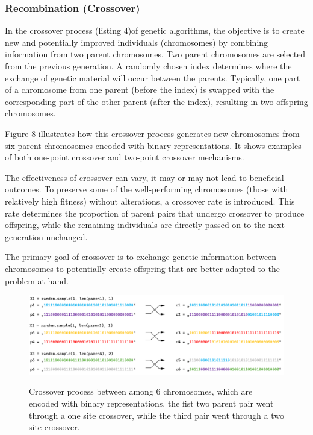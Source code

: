 \documentclass[12pt]{article}
\begin{document}
\subsubsection{Recombination (Crossover)}

In the crossover process (listing 4)of genetic algorithms, the objective is to create new and potentially improved individuals (chromosomes) by combining information from two parent chromosomes. Two parent chromosomes are selected from the previous generation. A randomly chosen index determines where the exchange of genetic material will occur between the parents. Typically, one part of a chromosome from one parent (before the index) is swapped with the corresponding part of the other parent (after the index), resulting in two offspring chromosomes.

Figure 8 illustrates how this crossover process generates new chromosomes from six parent chromosomes encoded with binary representations. It shows examples of both one-point crossover and two-point crossover mechanisms.



The effectiveness of crossover can vary, it may or may not lead to beneficial outcomes. To preserve some of the well-performing chromosomes (those with relatively high fitness) without alterations, a crossover rate is introduced. This rate determines the proportion of parent pairs that undergo crossover to produce offspring, while the remaining individuals are directly passed on to the next generation unchanged.

The primary goal of crossover is to exchange genetic information between chromosomes to potentially create offspring that are better adapted to the problem at hand.
 
 
 
\begin{figure}[H]
\centering
\includegraphics[scale=0.40]{Picture7}\\
\caption{Crossover process between among 6 chromosomes, which are encoded with binary representations. the fist two parent pair went through a one site crossover, while the third pair went through a two site crossover.}
\end{figure}
\end{document}
